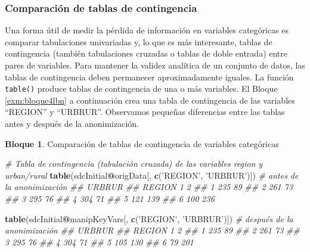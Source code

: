 \documentclass[]{book}
\newenvironment{Shaded}{\begin{snugshade}}{\end{snugshade}}
\newcommand{\CommentTok}[1]{\textcolor[rgb]{0.56,0.35,0.01}{\textit{#1}}}
\newcommand{\KeywordTok}[1]{\textcolor[rgb]{0.13,0.29,0.53}{\textbf{#1}}}
\newcommand{\NormalTok}[1]{#1}
\newcommand{\OperatorTok}[1]{\textcolor[rgb]{0.81,0.36,0.00}{\textbf{#1}}}
\newcommand{\StringTok}[1]{\textcolor[rgb]{0.31,0.60,0.02}{#1}}
\theoremstyle{definition}
\theoremstyle{definition}
\newtheorem{example}{Bloque}[chapter]
\theoremstyle{definition}
\theoremstyle{definition}
\theoremstyle{remark}
\begin{document}
\hypertarget{comparaciuxf3n-de-tablas-de-contingencia}{%
\subsubsection{Comparación de tablas de contingencia}\label{comparaciuxf3n-de-tablas-de-contingencia}}

Una forma útil de medir la pérdida de información en variables categóricas es comparar tabulaciones univariadas y, lo que es más interesante, tablas de contingencia (también tabulaciones cruzadas o tablas de doble entrada) entre pares de variables. Para mantener la validez analítica de un conjunto de datos, las tablas de contingencia
deben permanecer aproximadamente iguales. La función \texttt{table()} produce tablas de contingencia de una o más variables. El Bloque \ref{exm:bloque4lbn} a continuación crea una tabla de contingencia de las variables ``REGION'' y ``URBRUR''. Observamos pequeñas diferencias entre las tablas antes y después de la anonimización.

\begin{example}
\protect\hypertarget{exm:bloque4lbn}{}{\label{exm:bloque4lbn} }Comparación de tablas de contingencia de variables categóricas
\end{example}

\begin{Shaded}
\begin{Highlighting}[]
\CommentTok{# Tabla de contingencia (tabulación cruzada) de las variables region y urban/rural}
 \KeywordTok{table}\NormalTok{(sdcInitial}\OperatorTok{@}\NormalTok{origData[, }\KeywordTok{c}\NormalTok{(}\StringTok{'REGION'}\NormalTok{, }\StringTok{'URBRUR'}\NormalTok{)]) }\CommentTok{# antes de la anonimización}
 \CommentTok{##       URBRUR}
 \CommentTok{## REGION   1   2}
 \CommentTok{##      1 235  89}
 \CommentTok{##      2 261  73}
 \CommentTok{##      3 295  76}
 \CommentTok{##      4 304  71}
 \CommentTok{##      5 121 139}
 \CommentTok{##      6 100 236}

 \KeywordTok{table}\NormalTok{(sdcInitial}\OperatorTok{@}\NormalTok{manipKeyVars[, }\KeywordTok{c}\NormalTok{(}\StringTok{'REGION'}\NormalTok{, }\StringTok{'URBRUR'}\NormalTok{)]) }\CommentTok{# después de la anonimización}
 \CommentTok{##       URBRUR}
 \CommentTok{## REGION   1   2}
 \CommentTok{##      1 235  89}
 \CommentTok{##      2 261  73}
 \CommentTok{##      3 295  76}
 \CommentTok{##      4 304  71}
 \CommentTok{##      5 105 130}
 \CommentTok{##      6  79 201}
\end{Highlighting}
\end{Shaded}
\end{document}

